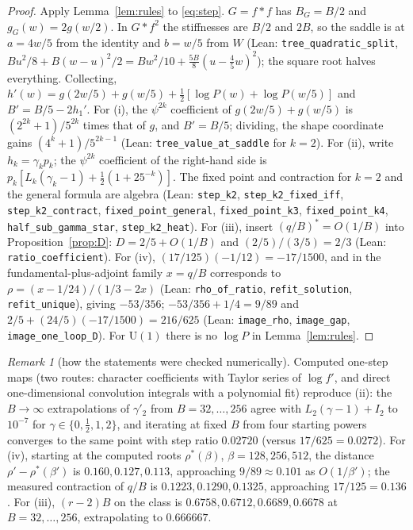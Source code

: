 \documentclass[11pt,a4paper]{article}
\theoremstyle{definition}
\theoremstyle{remark}
\newtheorem{remark}[lemma]{Remark}
\newcommand{\code}[1]{\texttt{#1}}
\begin{document}
\begin{proof}
Apply Lemma~\ref{lem:rules} to \eqref{eq:step}.
$G=f*f$ has $B_G=B/2$ and $g_G(w)=2g(w/2)$.
In $G*f^2$ the stiffnesses are $B/2$ and $2B$, so the saddle is at $a=4w/5$ from the identity and $b=w/5$ from $W$ (Lean: \code{tree\_quadratic\_split}, $Bu^2/8+B(w-u)^2/2=Bw^2/10+\tfrac{5B}8(u-\tfrac45w)^2$); the square root halves everything.
Collecting, $h'(w)=g(2w/5)+g(w/5)+\tfrac12[\log P(w)+\log P(w/5)]$ and $B'=B/5-2h_1'$.
For (i), the $\psi^{2k}$ coefficient of $g(2w/5)+g(w/5)$ is $(2^{2k}+1)/5^{2k}$ times that of $g$, and $B'=B/5$; dividing, the shape coordinate gains $(4^k+1)/5^{2k-1}$ (Lean: \code{tree\_value\_at\_saddle} for $k=2$).
For (ii), write $h_k=\gamma_kp_k$; the $\psi^{2k}$ coefficient of the right-hand side is $p_k[L_k(\gamma_k-1)+\tfrac12(1+25^{-k})]$.
The fixed point and contraction for $k=2$ and the general formula are algebra (Lean: \code{step\_k2}, \code{step\_k2\_fixed\_iff}, \code{step\_k2\_contract}, \code{fixed\_point\_general}, \code{fixed\_point\_k3}, \code{fixed\_point\_k4}, \code{half\_sub\_gamma\_star}, \code{step\_k2\_heat}).
For (iii), insert $(q/B)^*=O(1/B)$ into Proposition~\ref{prop:D}: $D=2/5+O(1/B)$ and $(2/5)/(3/5)=2/3$ (Lean: \code{ratio\_coefficient}).
For (iv), $(17/125)(-1/12)=-17/1500$, and in the fundamental-plus-adjoint family $x=q/B$ corresponds to $\rho=(x-1/24)/(1/3-2x)$ (Lean: \code{rho\_of\_ratio}, \code{refit\_solution}, \code{refit\_unique}), giving $-53/356$; $-53/356+1/4=9/89$ and $2/5+(24/5)(-17/1500)=216/625$ (Lean: \code{image\_rho}, \code{image\_gap}, \code{image\_one\_loop\_D}).
For $\mathrm{U}(1)$ there is no $\log P$ in Lemma~\ref{lem:rules}.
\end{proof}

\begin{remark}[how the statements were checked numerically]
Computed one-step maps (two routes: character coefficients with Taylor series of $\log f'$, and direct one-dimensional convolution integrals with a polynomial fit) reproduce (ii): the $B\to\infty$ extrapolations of $\gamma'_2$ from $B=32,\dots,256$ agree with $L_2(\gamma-1)+I_2$ to $10^{-7}$ for $\gamma\in\{0,\tfrac12,1,2\}$, and iterating at fixed $B$ from four starting powers converges to the same point with step ratio $0.02720$ (versus $17/625=0.0272$).
For (iv), starting at the computed roots $\rho^*(\beta)$, $\beta=128,256,512$, the distance $\rho'-\rho^*(\beta')$ is $0.160,0.127,0.113$, approaching $9/89\approx0.101$ as $O(1/\beta')$; the measured contraction of $q/B$ is $0.1223,0.1290,0.1325$, approaching $17/125=0.136$.
For (iii), $(r-2)B$ on the class is $0.6758,0.6712,0.6689,0.6678$ at $B=32,\dots,256$, extrapolating to $0.666667$.
\end{remark}
\end{document}
